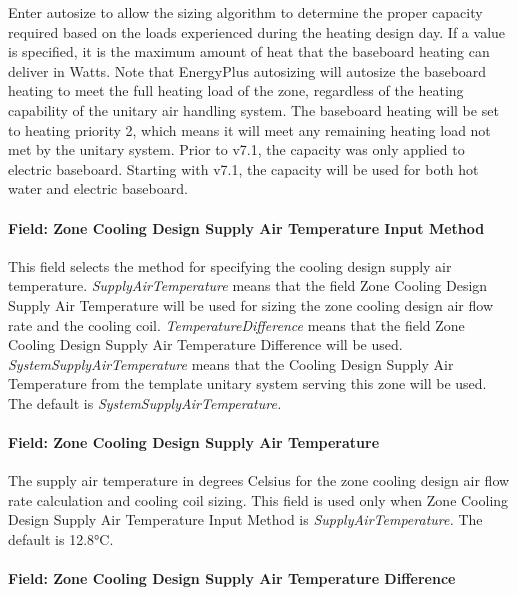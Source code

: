 Enter autosize to allow the sizing algorithm to determine the proper capacity required based on the loads experienced during the heating design day. If a value is specified, it is the maximum amount of heat that the baseboard heating can deliver in Watts. Note that EnergyPlus autosizing will autosize the baseboard heating to meet the full heating load of the zone, regardless of the heating capability of the unitary air handling system. The baseboard heating will be set to heating priority 2, which means it will meet any remaining heating load not met by the unitary system. Prior to v7.1, the capacity was only applied to electric baseboard. Starting with v7.1, the capacity will be used for both hot water and electric baseboard.

\paragraph{Field: Zone Cooling Design Supply Air Temperature Input Method}\label{field-zone-cooling-design-supply-air-temperature-input-method-5}

This field selects the method for specifying the cooling design supply air temperature. \emph{SupplyAirTemperature} means that the field Zone Cooling Design Supply Air Temperature will be used for sizing the zone cooling design air flow rate and the cooling coil. \emph{TemperatureDifference} means that the field Zone Cooling Design Supply Air Temperature Difference will be used. \emph{SystemSupplyAirTemperature} means that the Cooling Design Supply Air Temperature from the template unitary system serving this zone will be used. The default is \emph{SystemSupplyAirTemperature.}

\paragraph{Field: Zone Cooling Design Supply Air Temperature}\label{field-zone-cooling-design-supply-air-temperature-4}

The supply air temperature in degrees Celsius for the zone cooling design air flow rate calculation and cooling coil sizing. This field is used only when Zone Cooling Design Supply Air Temperature Input Method is \emph{SupplyAirTemperature.} The default is 12.8°C.

\paragraph{Field: Zone Cooling Design Supply Air Temperature Difference}\label{field-zone-cooling-design-supply-air-temperature-difference-5}

